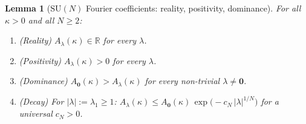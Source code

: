 \documentclass[11pt,a4paper]{amsart}
\newtheorem{lemma}[theorem]{Lemma}
\theoremstyle{definition}
\newcommand{\SU}{\mathrm{SU}}
\newcommand{\R}{\mathbb{R}}
\begin{document}
\begin{lemma}[$\SU(N)$ Fourier coefficients: reality, positivity, dominance]
\label{lem:SUN_dominance}
For all $\kappa > 0$ and all $N \ge 2$:
\begin{enumerate}[label=(\roman*)]
\item \emph{(Reality)} $A_\lambda(\kappa) \in \R$ for every $\lambda$.
\item \emph{(Positivity)} $A_\lambda(\kappa) > 0$ for every $\lambda$.
\item \emph{(Dominance)} $A_\mathbf{0}(\kappa) > A_\lambda(\kappa)$
      for every non-trivial $\lambda \ne \mathbf{0}$.
\item \emph{(Decay)} For $|\lambda| := \lambda_1 \ge 1$:
      $A_\lambda(\kappa) \le A_\mathbf{0}(\kappa)\,\exp\!\bigl(
      -c_N\,|\lambda|^{1/N}\bigr)$ for a universal $c_N > 0$.
\end{enumerate}
\end{lemma}
\end{document}
